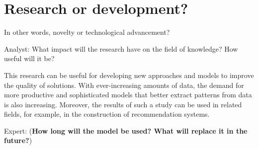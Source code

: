 \documentclass[12pt]{article}
\begin{document}
\section{Research or development?}
In other words, novelty or technological advancement?

{Analyst:} What impact will the research have on the field of knowledge? How useful will it be?

This research can be useful for developing new approaches and models to improve the quality of solutions. With ever-increasing amounts of data, the demand for more productive and sophisticated models that better extract patterns from data is also increasing. Moreover, the results of such a study can be used in related fields, for example, in the construction of recommendation systems.

{Expert:} (\textbf{How long will the model be used? What will replace it in the future?})
\end{document}
